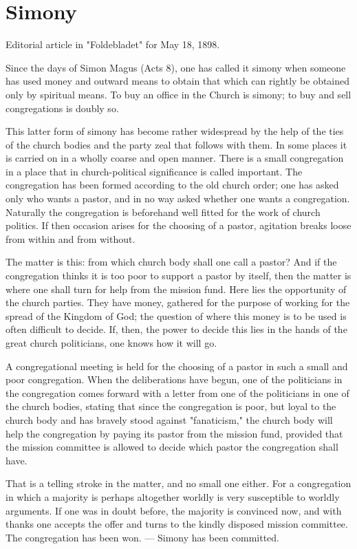 
\section{Simony}

Editorial article in "Foldebladet" for May 18, 1898.

Since the days of Simon Magus (Acts 8), one has called it simony when someone has used money and outward means to obtain that which can rightly be obtained only by spiritual means. To buy an office in the Church is simony; to buy and sell congregations is doubly so.

This latter form of simony has become rather widespread by the help of the ties of the church bodies and the party zeal that follows with them. In some places it is carried on in a wholly coarse and open manner. There is a small congregation in a place that in church-political significance is called important. The congregation has been formed according to the old church order; one has asked only who wants a pastor, and in no way asked whether one wants a congregation. Naturally the congregation is beforehand well fitted for the work of church politics. If then occasion arises for the choosing of a pastor, agitation breaks loose from within and from without.

The matter is this: from which church body shall one call a pastor? And if the congregation thinks it is too poor to support a pastor by itself, then the matter is where one shall turn for help from the mission fund. Here lies the opportunity of the church parties. They have money, gathered for the purpose of working for the spread of the Kingdom of God; the question of where this money is to be used is often difficult to decide. If, then, the power to decide this lies in the hands of the great church politicians, one knows how it will go.

A congregational meeting is held for the choosing of a pastor in such a small and poor congregation. When the deliberations have begun, one of the politicians in the congregation comes forward with a letter from one of the politicians in one of the church bodies, stating that since the congregation is poor, but loyal to the church body and has bravely stood against "fanaticism," the church body will help the congregation by paying its pastor from the mission fund, provided that the mission committee is allowed to decide which pastor the congregation shall have.

That is a telling stroke in the matter, and no small one either. For a congregation in which a majority is perhaps altogether worldly is very susceptible to worldly arguments. If one was in doubt before, the majority is convinced now, and with thanks one accepts the offer and turns to the kindly disposed mission committee. The congregation has been won. — Simony has been committed.

